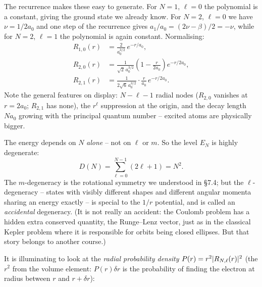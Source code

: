 \documentclass[a4paper]{scrartcl}
\begin{document}
\begin{example}
    The recurrence makes these easy to generate. For $N = 1$, $\ell = 0$ the polynomial is a constant, giving the ground state we already know. For $N = 2$, $\ell = 0$ we have $\nu = 1/2a_0$ and one step of the recurrence gives $a_1 / a_0 = (2\nu - \beta)/2 = -\nu$, while for $N = 2$, $\ell = 1$ the polynomial is again constant. Normalising:
    \begin{align*}
        R_{1,0}(r) &= \frac{2}{a_0^{3/2}} \, e^{-r/a_0}, \\
        R_{2,0}(r) &= \frac{1}{\sqrt{2} \, a_0^{3/2}} \left( 1 - \frac{r}{2 a_0} \right) e^{-r/2a_0}, \\
        R_{2,1}(r) &= \frac{1}{2\sqrt{6} \, a_0^{3/2}} \cdot \frac{r}{a_0} \, e^{-r/2a_0}.
    \end{align*}
    Note the general features on display: $N - \ell - 1$ radial nodes ($R_{2,0}$ vanishes at $r = 2a_0$; $R_{2,1}$ has none), the $r^\ell$ suppression at the origin, and the decay length $N a_0$ growing with the principal quantum number -- excited atoms are physically bigger.
\end{example}

The energy depends on $N$ \emph{alone} -- not on $\ell$ or $m$. So the level $E_N$ is highly degenerate:
$$
D(N) = \sum_{\ell = 0}^{N-1} (2 \ell + 1) = N^2.
$$
The $m$-degeneracy is the rotational symmetry we understood in \S 7.4; but the $\ell$-degeneracy -- states with visibly different shapes and different angular momenta sharing an energy exactly -- is special to the $1/r$ potential, and is called an \emph{accidental} degeneracy. (It is not really an accident: the Coulomb problem has a hidden extra conserved quantity, the Runge--Lenz vector, just as in the classical Kepler problem where it is responsible for orbits being closed ellipses. But that story belongs to another course.)

It is illuminating to look at the \emph{radial probability density} $P(r) = r^2 \lvert R_{N,\ell}(r)\rvert^2$ (the $r^2$ from the volume element: $P(r) \delta r$ is the probability of finding the electron at radius between $r$ and $r + \delta r$):
\end{document}
